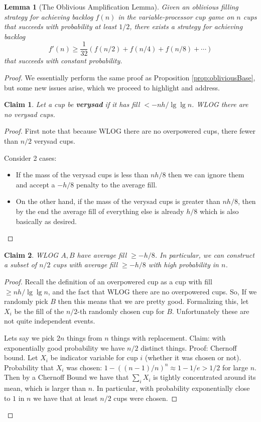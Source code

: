 \documentclass[twocolumn]{article}[10pt]
\newcommand{\defn}[1]{{\textit{\textbf{\boldmath #1}}}\xspace}
\newtheorem{clm}{Claim}
\newtheorem{lemma}{Lemma}
\begin{document}
\begin{lemma}[The Oblivious Amplification Lemma]
  \label{lem:obliviousAmplification}
  Given an oblivious filling strategy for achieving backlog $f(n)$ in the
  variable-processor cup game on $n$ cups that succeeds with probability at
  least $1/2$, there exists a strategy for achieving backlog 
  $$f'(n) \ge \frac{1}{32}(f(n/2) + f(n/4) + f(n/8) + \cdots) $$ that succeeds
  with constant probability.
\end{lemma}
\begin{proof}
  We essentially perform the same proof as Proposition
  \ref{prop:obliviousBase}, but some new issues arise, which we proceed to
  highlight and address. 

\begin{clm}
  Let a cup be \defn{verysad} if it has fill $< -nh/\lg\lg n$.
  WLOG there are no verysad cups. 
\end{clm}
\begin{proof}
  First note that because WLOG there are no overpowered cups, there fewer than $n/2$ verysad cups.

  Consider 2 cases:
  \begin{itemize}
    \item If the mass of the verysad cups is less than $nh/8$ then we can
      ignore them and accept a $-h/8$ penalty to the average fill.
    \item On the other hand, if the mass of the verysad cups is greater than
      $nh/8$, then by the end the average fill of everything else is already
      $h/8$ which is also basically as desired.
  \end{itemize}
\end{proof}

\begin{clm}
  WLOG $A,B$ have average fill $\ge -h/8$.
  In particular, we can construct a subset of $n/2$
  cups with average fill $\ge -h/8$ with high probability in $n$. 
\end{clm}
\begin{proof}

  Recall the definition of an overpowered cup as a cup with fill $\ge nh / \lg \lg n$,
  and the fact that WLOG there are no overpowered cups.
  So, If we randomly pick $B$ then this means that we are pretty good. 
  Formalizing this, let $X_i$ be the fill of the $n/2$-th randomly chosen cup
  for $B$. Unfortunately these are not quite independent events.

  Lets say we pick $2n$ things from $n$ things with replacement. Claim: with
  exponentially good probability we have $n/2$ distinct things. 
  Proof: Chernoff bound. Let $X_i$ be indicator variable for cup $i$ (whether
  it was chosen or not). Probability that $X_i$ was chosen: $1-((n-1)/n)^n
  \approx 1-1/e > 1/2$ for large $n$. 
  Then by a Chernoff Bound we have that $\sum_i X_i$ is tightly concentrated
  around its mean, which is larger than $n$. In particular, with probability
  exponentially close to $1$ in $n$ we have that at least $n/2$ cups were chosen.


\end{proof}
\end{proof}
\end{document}
